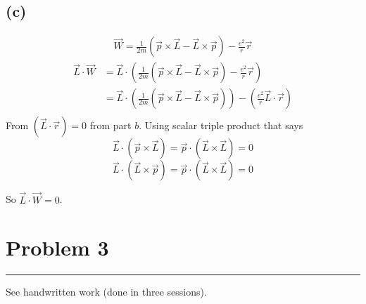 \documentclass[letter, 10pts]{article}
\begin{document}
\subsection*{(c)} 
\begin{align*}
	\vec{W} = \frac{1}{2m} (\vec{p} \times  \vec{L} - \vec{L} \times  \vec{p} ) - \frac{e ^2}{r}\vec{r}
\end{align*}
\begin{align*}
\vec{L} \cdot  \vec{W} &= \vec{L}  \cdot
\left( \frac{1}{2m} (\vec{p} \times  \vec{L} - \vec{L} \times  \vec{p} ) - \frac{e ^2}{r}\vec{r}\right) 
\\
 &= \vec{L}  \cdot
\left( \frac{1}{2m} (\vec{p} \times  \vec{L} - \vec{L} \times  \vec{p} ) \right) - \left(\frac{e ^2}{r} \vec{L} \cdot  \vec{r}\right) 
\\
\end{align*}
From $(\vec{L} \cdot  \vec{r}) = 0$ from part $b$. 
Using scalar triple product that says 
\[
\vec{L} \cdot  (\vec{p} \times \vec{L}) = \vec{p} \cdot (\vec{L} \times  \vec{L}) = 0  
\]
\[
\vec{L} \cdot  (\vec{L} \times \vec{p}) = \vec{p} \cdot  (\vec{L} \times \vec{L}) = 0
\] 

So $\vec{L} \cdot  \vec{W} = 0$. 


\newpage
\section*{Problem 3}
\hrule 

See handwritten work (done in three sessions). 
\end{document}
